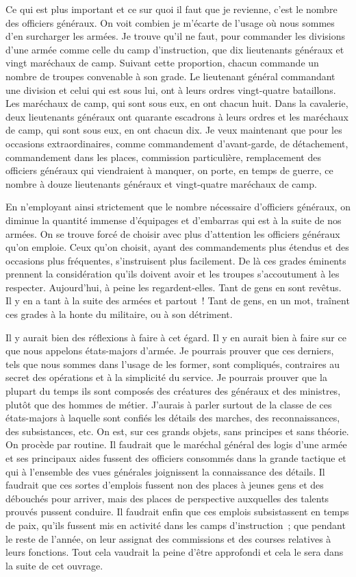 \documentclass[french,twoside]{book} %
\begin{document}
Ce qui est plus important et ce sur quoi il faut que je revienne, c’est le nombre des officiers généraux. On voit combien je m’écarte de l’usage où nous sommes d’en surcharger les armées. Je trouve qu’il ne faut, pour commander les divisions d’une armée comme celle du camp d’instruction, que dix lieutenants généraux et vingt maréchaux de camp. Suivant cette proportion, chacun commande un nombre de troupes convenable à son grade. Le lieutenant général commandant une division et celui qui est sous lui, ont à leurs ordres vingt-quatre bataillons. Les maréchaux de camp, qui sont sous eux, en ont chacun huit. Dans la cavalerie, deux lieutenants généraux ont quarante escadrons à leurs ordres et les maréchaux de camp, qui sont sous eux, en ont chacun dix. Je veux maintenant que pour les occasions extraordinaires, comme commandement d’avant-garde, de détachement, commandement dans les places, commission particulière, remplacement des officiers généraux qui viendraient à manquer, on porte, en temps de guerre, ce nombre à douze lieutenants généraux et vingt-quatre maréchaux de camp.\par
En n’employant ainsi strictement que le nombre nécessaire d’officiers généraux, on diminue la quantité immense d’équipages et d’embarras qui est à la suite de nos armées. On se trouve forcé de choisir avec plus d’attention les officiers généraux qu’on emploie. Ceux qu’on choisit, ayant des commandements plus étendus et des occasions plus fréquentes, s’instruisent plus facilement. De là ces grades éminents prennent la considération qu’ils doivent avoir et les troupes s’accoutument à les respecter. Aujourd’hui, à peine les regardent-elles. Tant de gens en sont revêtus. Il y en a tant à la suite des armées et partout ! Tant de gens, en un mot, traînent ces grades à la honte du militaire, ou à son détriment.\par
Il y aurait bien des réflexions à faire à cet égard. Il y en aurait bien à faire sur ce que nous appelons états-majors d’armée. Je pourrais prouver que ces derniers, tels que nous sommes dans l’usage de les former, sont compliqués, contraires au secret des opérations et à la simplicité du service. Je pourrais prouver que la plupart du temps ils sont composés des créatures des généraux et des ministres, plutôt que des hommes de métier. J’aurais à parler surtout de la classe de ces états-majors à laquelle sont confiés les détails des marches, des reconnaissances, des subsistances, etc. On est, sur ces grands objets, sans principes et sans théorie. On procède par routine. Il faudrait que le maréchal général des logis d’une armée et ses principaux aides fussent des officiers consommés dans la grande tactique et qui à l’ensemble des vues générales joignissent la connaissance des détails. Il faudrait que ces sortes d’emplois fussent non des places à jeunes gens et des débouchés pour arriver, mais des places de perspective auxquelles des talents prouvés pussent conduire. Il faudrait enfin que ces emplois subsistassent en temps de paix, qu’ils fussent mis en activité dans les camps d’instruction ; que pendant le reste de l’année, on leur assignat des commissions et des courses relatives à leurs fonctions. Tout cela vaudrait la peine d’être approfondi et cela le sera dans la suite de cet ouvrage.\par
\end{document}
